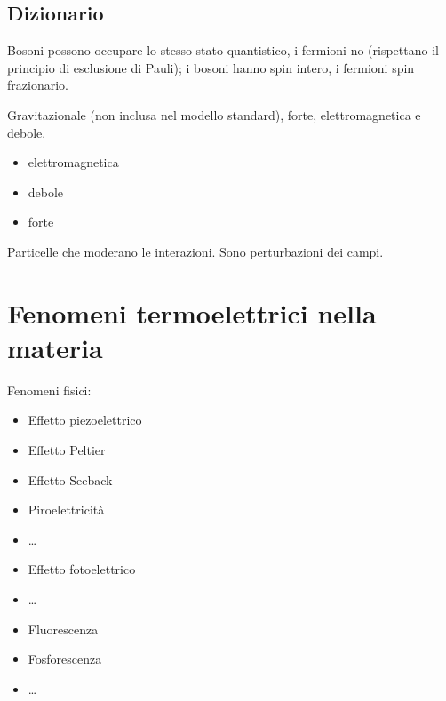 \documentclass[letterpaper,10pt,italian]{jupyterBook}
\begin{document}
\section{Dizionario}
\label{\detokenize{ch/modern/standard:dizionario}}
\sphinxAtStartPar
{} Bosoni possono occupare lo stesso stato quantistico, i fermioni no (rispettano il principio di esclusione di Pauli); i bosoni hanno spin intero, i fermioni spin frazionario.

\sphinxAtStartPar
{} Gravitazionale (non inclusa nel modello standard), forte, elettromagnetica e debole.
\begin{itemize}
\item {} 
\sphinxAtStartPar
elettromagnetica

\item {} 
\sphinxAtStartPar
debole

\item {} 
\sphinxAtStartPar
forte

\end{itemize}

\sphinxAtStartPar
{} Particelle che moderano le interazioni. Sono perturbazioni dei campi.

\sphinxstepscope


\chapter{Fenomeni termo\sphinxhyphen{}elettrici nella materia}
\label{\detokenize{ch/modern/intro-coupling:fenomeni-termo-elettrici-nella-materia}}\label{\detokenize{ch/modern/intro-coupling:physics-hs-modern-coupling}}\label{\detokenize{ch/modern/intro-coupling::doc}}
\sphinxAtStartPar
Fenomeni fisici:
\begin{itemize}
\item {} 
\sphinxAtStartPar
Effetto piezoelettrico

\item {} 
\sphinxAtStartPar
Effetto Peltier

\item {} 
\sphinxAtStartPar
Effetto Seeback

\item {} 
\sphinxAtStartPar
Piroelettricità

\item {} 
\sphinxAtStartPar
…

\item {} 
\sphinxAtStartPar
Effetto fotoelettrico

\item {} 
\sphinxAtStartPar
…

\item {} 
\sphinxAtStartPar
Fluorescenza

\item {} 
\sphinxAtStartPar
Fosforescenza

\item {} 
\sphinxAtStartPar
…

\end{itemize}
\end{document}
